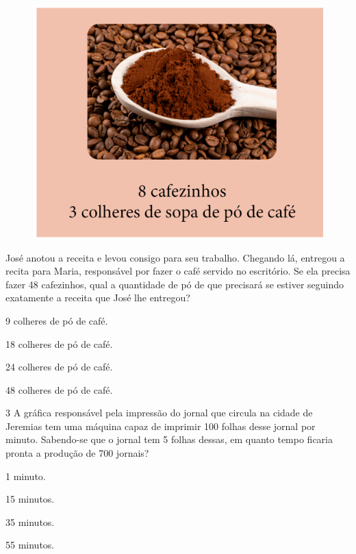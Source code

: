 \begin{figure}[htpb!]
\centering
\includegraphics[width=.4\textwidth]{../ilustracoes/MAT5/SAEB_5ANO_MAT_figura80.png}
\end{figure}

José anotou a receita e levou consigo para seu trabalho. Chegando lá,
entregou a recita para Maria, responsável por fazer o café servido no
escritório. Se ela precisa fazer 48 cafezinhos, qual a
quantidade de pó de que precisará se estiver seguindo exatamente a receita que José lhe entregou?

\begin{minipage}{.5\textwidth}
\begin{escolha}
\item
  9 colheres de pó de café.
\item
  18 colheres de pó de café.
\item
  24 colheres de pó de café.
\item
  48 colheres de pó de café.
\end{escolha}
\end{minipage}

\num{3} A gráfica responsável pela impressão do jornal que circula na
cidade de Jeremias tem uma máquina capaz de imprimir 100 folhas desse jornal por minuto. Sabendo-se que o jornal tem 5 folhas dessas, em
quanto tempo ficaria pronta a produção de 700 jornais?

\begin{minipage}{.5\textwidth}
\begin{escolha}
\item
  1 minuto.
\item
  15 minutos.
\item
  35 minutos.
\item
  55 minutos.
\end{escolha}
\end{minipage}

